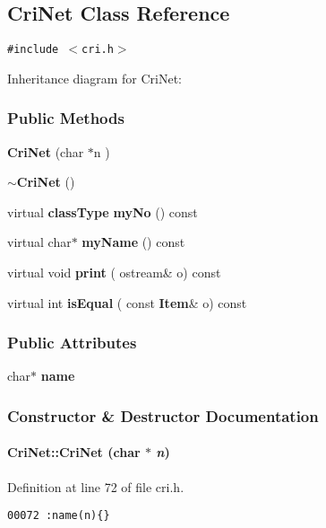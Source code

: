 \subsection{Cri\-Net  Class Reference}
\label{CriNet}
{\tt \#include $<$cri.h$>$}

Inheritance diagram for Cri\-Net:\begin{figure}[H]
\begin{center}
\leavevmode
\setlength{\epsfysize}{2cm}
\end{center}
\end{figure}
\subsubsection*{Public Methods}
\begin{CompactItemize}
\item 
{\bf Cri\-Net} (char $\ast$n )
\item 
{\bf $\sim$Cri\-Net} ()
\item 
virtual {\bf class\-Type} {\bf my\-No} () const
\item 
virtual char$\ast$ {\bf my\-Name} () const
\item 
virtual void {\bf print} ( ostream\& o) const
\item 
virtual int {\bf is\-Equal} ( const {\bf Item}\& o) const
\end{CompactItemize}
\subsubsection*{Public Attributes}
\begin{CompactItemize}
\item 
char$\ast$ {\bf name}
\end{CompactItemize}


\subsubsection{Constructor \& Destructor Documentation}
\label{CriNet_a0}
\paragraph{\setlength{\rightskip}{0pt plus 5cm}Cri\-Net::Cri\-Net (char $\ast$ {\em n})}\hfill



Definition at line 72 of file cri.h.\small\begin{verbatim}00072 :name(n){}
\end{verbatim}\normalsize 
\label{CriNet_a1}
